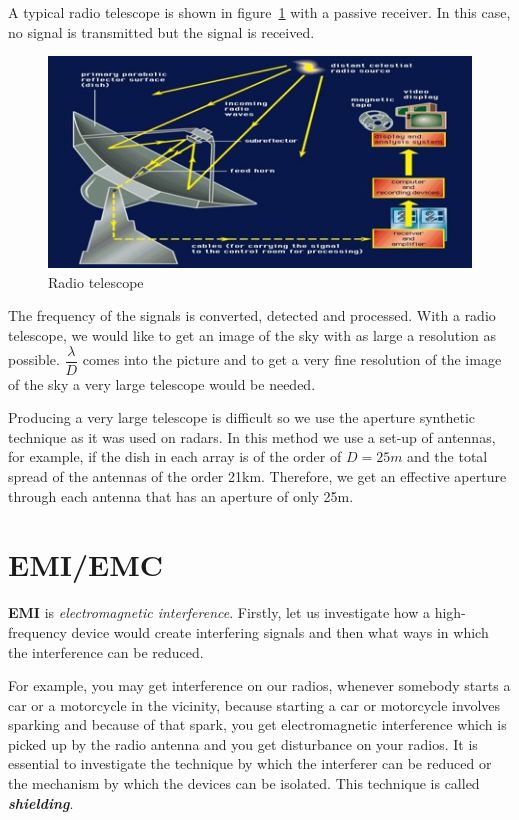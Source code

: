 A typical radio telescope is shown in figure~\ref{fig:radiotelescope0} with a passive receiver. In this case, no signal is transmitted but the signal is received.
\begin{figure}[h]
\centering
\includegraphics[scale=0.5]{./graphics/Radio-Telescope-0}
\caption{Radio telescope}
\label{fig:radiotelescope0}
\end{figure}

The frequency of the signals is converted, detected and processed. With a radio telescope, we would like to get an image of the sky with as large a resolution as possible. $\dfrac{\lambda}{D}$ comes into the picture and to get a very fine resolution of the image of the sky a very large telescope would be needed.

Producing a very large telescope is difficult so we use the aperture synthetic technique as it was used on radars. In this method we use a set-up of antennas, for example, if the dish in each array is of the order of $ D = 25m $ and the total spread of the antennas of the order 21km. Therefore, we get an effective aperture through each antenna that has an aperture of only 25m.

\section{EMI/EMC}

\textbf{EMI} is \textit{electromagnetic interference}. Firstly, let us investigate how a high-frequency device would create interfering signals and then what ways in which the interference can be reduced.

For example, you may get interference on our radios, whenever somebody starts a car or a motorcycle in the vicinity, because starting a car or motorcycle involves sparking and because of that spark, you get electromagnetic interference which is picked up by the radio antenna and you get disturbance on your radios. It is essential to investigate the technique by which the interferer can be reduced or the mechanism by which the devices can be isolated. This technique is called \textit{\textbf{shielding}}.

